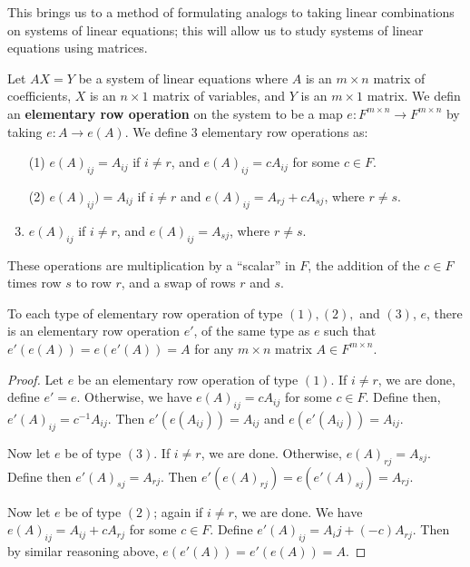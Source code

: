 This brings us to a method of formulating analogs to taking linear combinations on systems of linear
equations; this will allow us to study systems of linear equations using matrices.

\begin{definition}
    Let $AX=Y$ be a system of linear equations where  $A$ is an  $m \times n$ matrix of
    coefficients,  $X$ is an  $n \times 1$ matrix of variables, and  $Y$ is an  $m \times 1$ matrix.
    We defin an  \textbf{elementary row operation} on the system to be a map $e:F^{m \times n}
    \rightarrow F^{m \times n}$ by taking $e:A \rightarrow e(A)$. We define $3$ elementary row
    operations as:
        \begin{enumerate}
            \item[(1)] $e(A)_{ij}=A_{ij}$ if $i \neq r$, and  $e(A)_{ij}=cA_{ij}$ for some $c \in
                F$.

            \item [(2)] $e(A)_{ij})=A_{ij}$ if $i \neq r$ and  $e(A)_{ij}=A_{rj}+cA_{sj}$, where $r
                \neq s$.

            \item  $e(A)_{ij}$ if  $i \neq r$, and $e(A)_{ij}=A_{sj}$, where $r \neq s$.
        \end{enumerate}
\end{definition}

These operations are multiplication by a ``scalar'' in $F$, the addition of the  $c \in F$ times row
 $s$ to row  $r$, and a swap of rows  $r$ and  $s$. 

\begin{theorem}\label{1.2.1}
     To each type of elementary row operation of type $(1), (2),$ and $(3)$, $e$, there is an
     elementary row operation  $e'$, of the same type as  $e$ such that  $e'(e(A))=e(e'(A))=A$ for
     any $m \times n$ matrix  $A \in F^{m \times n}$.
\end{theorem}
\begin{proof}
     Let $e$ be an elementary row operation of type $(1)$. If $i \neq r$, we are done, define
     $e'=e$.  Otherwise, we have $e(A)_{ij}=cA_{ij}$ for some $c \in F$. Define then,
     $e'(A)_{ij}=c^{-1}A_{ij}$. Then $e'(e(A_{ij}))=A_{ij}$ and $e(e'(A_{ij}))=A_{ij}$.

     Now let $e$ be of type  $(3)$. If $i \neq r$, we are done. Otherwise, $e(A)_{rj}=A_{sj}$.
     Define then $e'(A)_{sj}=A_{rj}$. Then $e'(e(A)_{rj})=e(e'(A)_{sj})=A_{rj}$.

     Now let $e$ be of type  $(2)$; again if $i \neq r$, we are done. We have
     $e(A)_{ij}=A_{ij}+cA_{rj}$ for some $c \in F$. Define  $e'(A)_{ij}=A_ij+(-c)A_{rj}$. Then by
     similar reasoning above, $e(e'(A))=e'(e(A))=A$.
\end{proof}

